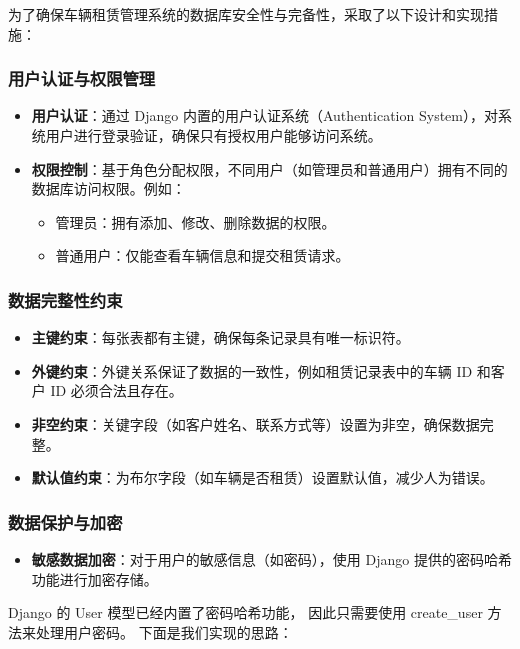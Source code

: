 \documentclass[UTF8,a4paper,12pt]{ctexart}
\begin{document}
为了确保车辆租赁管理系统的数据库安全性与完备性，采取了以下设计和实现措施：

\subsubsection{用户认证与权限管理}
\begin{itemize}
    \item \textbf{用户认证}：通过 Django 内置的用户认证系统（Authentication System），对系统用户进行登录验证，确保只有授权用户能够访问系统。
    \item \textbf{权限控制}：基于角色分配权限，不同用户（如管理员和普通用户）拥有不同的数据库访问权限。例如：
    \begin{itemize}
        \item 管理员：拥有添加、修改、删除数据的权限。
        \item 普通用户：仅能查看车辆信息和提交租赁请求。
    \end{itemize}
\end{itemize}

\subsubsection{数据完整性约束}
\begin{itemize}
    \item \textbf{主键约束}：每张表都有主键，确保每条记录具有唯一标识符。
    \item \textbf{外键约束}：外键关系保证了数据的一致性，例如租赁记录表中的车辆 ID 和客户 ID 必须合法且存在。
    \item \textbf{非空约束}：关键字段（如客户姓名、联系方式等）设置为非空，确保数据完整。
    \item \textbf{默认值约束}：为布尔字段（如车辆是否租赁）设置默认值，减少人为错误。
\end{itemize}

\subsubsection{数据保护与加密}
\begin{itemize}
    \item \textbf{敏感数据加密}：对于用户的敏感信息（如密码），使用 Django 提供的密码哈希功能进行加密存储。
\end{itemize}

Django 的 User 模型已经内置了密码哈希功能，
因此只需要使用 create\_user 方法来处理用户密码。
下面是我们实现的思路：
\end{document}
